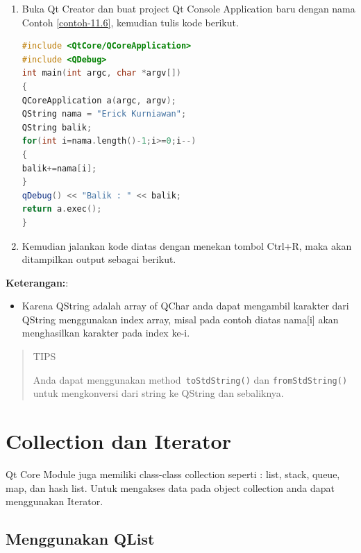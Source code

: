 \begin{enumerate}

\item
  Buka Qt Creator dan buat project Qt Console Application baru dengan
  nama Contoh \ref{contoh-11.6}, kemudian tulis kode berikut.

\begin{lstlisting}[language=c++, caption= Membalik String, label=contoh-11.6]
#include <QtCore/QCoreApplication>
#include <QDebug>
int main(int argc, char *argv[])
{
QCoreApplication a(argc, argv);
QString nama = "Erick Kurniawan";
QString balik;
for(int i=nama.length()-1;i>=0;i--)
{
balik+=nama[i];
}
qDebug() << "Balik : " << balik;
return a.exec();
}
\end{lstlisting}
\item
  Kemudian jalankan kode diatas dengan menekan tombol Ctrl+R, maka akan
  ditampilkan output sebagai berikut.
\end{enumerate}

\textbf{Keterangan:}:

\begin{itemize}

\item
  Karena QString adalah array of QChar anda dapat mengambil karakter
  dari QString menggunakan index array, misal pada contoh diatas
  nama{[}i{]} akan menghasilkan karakter pada index ke-i.
\end{itemize}

\begin{quotation}
	TIPS 
	
	Anda dapat
	menggunakan method\texttt{ toStdString()} dan \texttt{fromStdString()} untuk mengkonversi
	dari string ke QString dan sebaliknya.
\end{quotation}
 

\section{Collection dan Iterator}\label{collection-dan-iterator}

Qt Core Module juga memiliki class-class collection seperti : list,
stack, queue, map, dan hash list. Untuk mengakses data pada object
collection anda dapat menggunakan Iterator.

\subsection{Menggunakan QList}\label{menggunakan-qlist}

